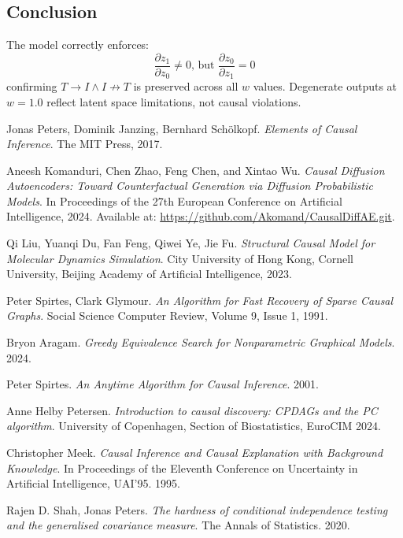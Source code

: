 \documentclass{article}
\begin{document}
	\subsection*{Conclusion}
	The model correctly enforces:
	$$\frac{\partial z_1}{\partial z_0} \neq 0 \text{, but } \frac{\partial z_0}{\partial z_1} = 0$$
	confirming $T \rightarrow I \land I \not \rightarrow T$ is preserved across all $w$ values. Degenerate outputs at $w=1.0$ reflect latent space limitations, not causal violations.
	
	\begin{thebibliography}{9}
		
	Jonas Peters, Dominik Janzing, Bernhard Schölkopf. 
	\textit{Elements of Causal Inference}. 
	The MIT Press, 2017.
	
	Aneesh Komanduri, Chen Zhao, Feng Chen, and Xintao Wu. \textit{Causal Diffusion Autoencoders: Toward Counterfactual Generation via Diffusion Probabilistic Models}. In Proceedings of the 27th European Conference on Artificial Intelligence, 2024. Available at: \url{https://github.com/Akomand/CausalDiffAE.git}.
	
	Qi Liu, Yuanqi Du, Fan Feng, Qiwei Ye, Jie Fu. 
	\textit{Structural Causal Model for Molecular Dynamics Simulation}. City University of Hong Kong, Cornell University, Beijing Academy of Artificial Intelligence, 2023.
	
	Peter Spirtes, Clark Glymour. 
	\textit{An Algorithm for Fast Recovery of Sparse Causal Graphs}. 
	Social Science Computer Review, Volume 9, Issue 1, 1991.
	
	Bryon Aragam. 
	\textit{Greedy Equivalence Search for Nonparametric Graphical Models}. 
	2024.
	
	Peter Spirtes. 
	\textit{An Anytime Algorithm for Causal Inference}. 
	2001.
	
	Anne Helby Petersen.
	\textit{Introduction to causal discovery: CPDAGs and the PC algorithm}. 
	University of Copenhagen, Section of Biostatistics, EuroCIM 2024.
	
	Christopher Meek. 
	\textit{Causal Inference and Causal Explanation with Background Knowledge}. 
	In Proceedings of the Eleventh Conference on Uncertainty in Artificial Intelligence, UAI’95. 
	1995.
	
	Rajen D. Shah, Jonas Peters. \textit{The hardness of conditional independence testing and the generalised covariance measure}.
	The Annals of Statistics. 
	2020.
	

\end{thebibliography}
\end{document}
